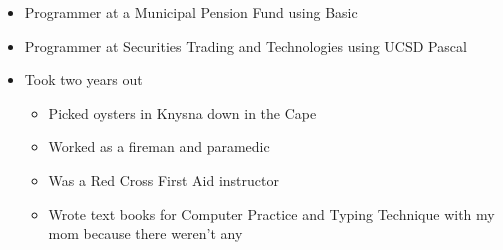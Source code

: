 \begin{frame}[t]
	\vspace{4\baselineskip}
	\begin{itemize}
		\item Programmer at a Municipal Pension Fund using Basic
		\item Programmer at Securities Trading and Technologies using UCSD Pascal
		\item Took two years out
		\begin{itemize}
			\item Picked oysters in Knysna down in the Cape
			\item Worked as a fireman and paramedic
			\item Was a Red Cross First Aid instructor
			\item Wrote text books for Computer Practice and Typing Technique with my mom because there weren't any
		\end{itemize}
	\end{itemize}
\note{}
\end{frame}